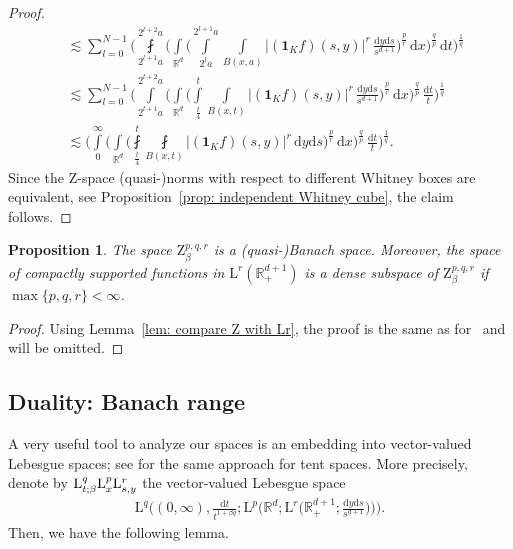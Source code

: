 \documentclass[11pt, leqno,parskip=half]{amsart}
\newtheorem{proposition}[theorem]{Proposition}
\theoremstyle{definition}
\newcommand{\IR}{\mathbb{R}}
\renewcommand{\L}{\mathrm{L}}
\newcommand{\Z}{\mathrm{Z}}
\renewcommand{\d}{\mathrm{d}}
\numberwithin{equation}{section}
\begin{document}
\begin{proof}
\begin{align*}
        &\lesssim \sum\limits_{l=0}^{N-1} \bigg(\fint\limits_{2^{l+1}a}^{2^{l+2}a}\bigg(\int\limits_{\IR^d}\bigg(\int\limits_{2^la}^{2^{l+1}a} \int\limits_{B(x,a)} |(\mathbf{1}_Kf)(s,y)|^r \,\frac{\d y \d s}{s^{d+1}}\bigg)^\frac{p}{r}\,\d x\bigg)^\frac{q}{p}\,\d t\bigg)^\frac{1}{q}\\
        &\lesssim\sum\limits_{l=0}^{N-1} \bigg(\int\limits_{2^{l+1}a}^{2^{l+2}a}\bigg(\int\limits_{\IR^d}\bigg(\int\limits_{\frac{t}{4}}^{t} \int\limits_{B(x,t)} |(\mathbf{1}_Kf)(s,y)|^r \,\frac{\d y \d s}{s^{d+1}}\bigg)^\frac{p}{r}\,\d x\bigg)^\frac{q}{p}\,\frac{\d t}{t}\bigg)^\frac{1}{q}\\
        &\lesssim  \bigg(\int\limits_0^\infty\bigg(\int\limits_{\IR^d}\bigg(\fint\limits_{\frac{t}{4}}^{t} \fint\limits_{B(x,t)} |(\mathbf{1}_Kf)(s,y)|^r \,\d y \d s\bigg)^\frac{p}{r}\,\d x\bigg)^\frac{q}{p}\,\frac{\d t}{t}\bigg)^\frac{1}{q}.
    \end{align*}
    Since the $\Z$-space (quasi-)norms  with respect to different Whitney boxes are equivalent, see Proposition~\ref{prop: independent Whitney cube}, the claim follows.
\end{proof}


\begin{proposition}
\label{prop: complete and dense subspace}
    The space $\Z^{p,q,r}_\beta$ is a (quasi-)Banach space. Moreover, the space of compactly supported functions in $\L^r(\IR^{d+1}_+)$ is a dense subspace of $\Z^{p,q,r}_\beta$ if $\max\{p,q,r\}<\infty$.
\end{proposition}

\begin{proof}
    Using Lemma~\ref{lem: compare Z with Lr}, the proof is the same as for~\cite[Proposition 3.5]{Amenta} and will be omitted.
\end{proof}


\subsection{Duality: Banach range}
\label{subsec: duality >1}

A very useful tool to analyze our spaces is an embedding into vector-valued Lebesgue spaces; see \cites{Amenta, HTV} for the same approach for tent spaces. More precisely, denote by $\L^q_{t;\beta}\L^p_{\vphantom{t,\beta}x}\L^r_{\vphantom{t,\beta}s,y}$ the vector-valued Lebesgue space
\begin{align*}
    \L^q\bigg((0,\infty), \frac{\d t}{t^{1+\beta q}} ; \L^p\Big(\IR^d; \L^r\Big(\IR^{d+1}_+; \frac{\d y \d s}{s^{d+1}}\Big) \Big) \bigg).
\end{align*}
Then, we have the following lemma.
\end{document}

